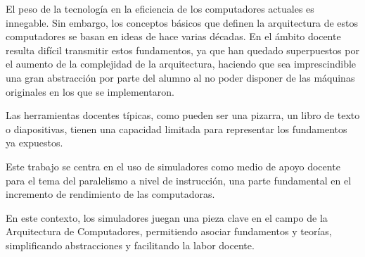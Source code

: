 El peso de la tecnología en la eficiencia de los computadores actuales
es innegable. Sin embargo, los conceptos básicos que definen la 
arquitectura de estos computadores se basan en ideas de hace varias décadas.
En el ámbito docente resulta difícil transmitir estos fundamentos, ya que 
han quedado superpuestos por el aumento de la complejidad de la arquitectura,
haciendo que sea imprescindible una gran abstracción por parte del alumno 
al no poder disponer de las máquinas originales en los que se implementaron.

\bigskip
Las herramientas docentes típicas, como pueden ser una pizarra, un libro 
de texto o diapositivas, tienen una capacidad limitada para representar 
los fundamentos ya expuestos.

\bigskip
Este trabajo se centra en el uso de simuladores como medio de apoyo docente
para el tema del  paralelismo a nivel de instrucción, una parte fundamental
en el incremento de rendimiento de las computadoras.

\bigskip
En este contexto, los simuladores juegan una pieza clave en el campo de 
la Arquitectura de Computadores, permitiendo asociar fundamentos y teorías,
 simplificando abstracciones y facilitando la labor docente.